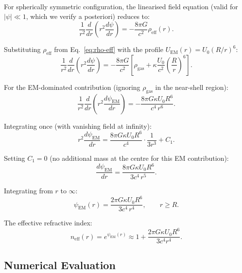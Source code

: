 \documentclass[amsmath,amssymb,aps,prd,superscriptaddress,nofootinbib]{revtex4-2}
\newcommand{\ka}{\kappa}
\begin{document}
For spherically symmetric configuration, the linearised field equation
(valid for $|\psi| \ll 1$, which we verify a posteriori) reduces to:
\begin{equation}
\frac{1}{r^2}\frac{d}{dr}\left(r^2 \frac{d\psi}{dr}\right)
= -\frac{8\pi G}{c^2} \rho_\text{eff}(r).
\end{equation}

Substituting $\rho_\text{eff}$ from Eq.~\eqref{eq:rho-eff} with the
profile $U_\text{EM}(r) = U_0 (R/r)^6$:
\begin{equation}
\frac{1}{r^2}\frac{d}{dr}\left(r^2 \frac{d\psi}{dr}\right)
= -\frac{8\pi G}{c^2} \left[\rho_\text{gas} + \ka \frac{U_0}{c^2}\left(\frac{R}{r}\right)^6 \right].
\end{equation}

For the EM-dominated contribution (ignoring $\rho_\text{gas}$ in the
near-shell region):
\begin{equation}
\frac{1}{r^2}\frac{d}{dr}\left(r^2 \frac{d\psi_\text{EM}}{dr}\right)
= -\frac{8\pi G \ka U_0 R^6}{c^4 \, r^6}.
\end{equation}

Integrating once (with vanishing field at infinity):
\begin{equation}
r^2 \frac{d\psi_\text{EM}}{dr} = \frac{8\pi G \ka U_0 R^6}{c^4} \cdot \frac{1}{3 r^3}
+ C_1.
\end{equation}

Setting $C_1 = 0$ (no additional mass at the centre for this EM contribution):
\begin{equation}
\frac{d\psi_\text{EM}}{dr} = \frac{8\pi G \ka U_0 R^6}{3 c^4 \, r^5}.
\end{equation}

Integrating from $r$ to $\infty$:
\begin{equation}\label{eq:psi-profile}
\boxed{
\psi_\text{EM}(r) = \frac{2\pi G \ka U_0 R^6}{3 c^4 \, r^4}, \qquad r \geq R.
}
\end{equation}

The effective refractive index:
\begin{equation}\label{eq:n-profile}
n_\text{eff}(r) = e^{\psi_\text{EM}(r)} \approx 1 + \frac{2\pi G \ka U_0 R^6}{3 c^4 r^4}.
\end{equation}

\subsection{Numerical Evaluation}
\end{document}
